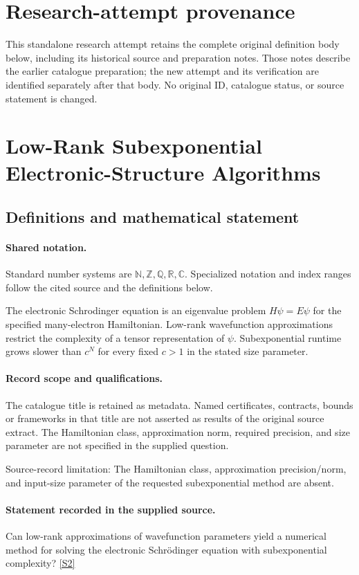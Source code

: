 \documentclass[11pt]{article}
\begin{document}
\section*{Research-attempt provenance}
This standalone research attempt retains the complete original definition body below,
including its historical source and preparation notes. Those notes describe the
earlier catalogue preparation; the new attempt and its verification are identified
separately after that body. No original ID, catalogue status, or source statement is changed.

\section{Low-Rank Subexponential Electronic-Structure Algorithms}\label{statement}

\subsection{Definitions and mathematical statement}

\paragraph{Shared notation.}Standard number systems are $\mathbb N,\mathbb Z,\mathbb Q,\mathbb R,\mathbb C$. Specialized notation and index ranges follow the cited source and the definitions below.


The electronic Schrodinger equation is an eigenvalue problem $H\psi=E\psi$ for the specified many-electron Hamiltonian. Low-rank wavefunction approximations restrict the complexity of a tensor representation of $\psi$. Subexponential runtime grows slower than $c^N$ for every fixed $c>1$ in the stated size parameter.
\paragraph{Record scope and qualifications.}
The catalogue title is retained as metadata. Named certificates, contracts, bounds or frameworks in that title are not asserted as results of the original source extract.
The Hamiltonian class, approximation norm, required precision, and size parameter are not specified in the supplied question.

Source-record limitation: The Hamiltonian class, approximation precision/norm, and input-size parameter of the requested subexponential method are absent.
\paragraph{Statement recorded in the supplied source.}
Can low-rank approximations of wavefunction parameters yield a numerical method for solving the electronic Schrödinger equation with subexponential complexity? \href{https://doi.org/10.4171/owr/2011/32}{[S2]}
\end{document}
